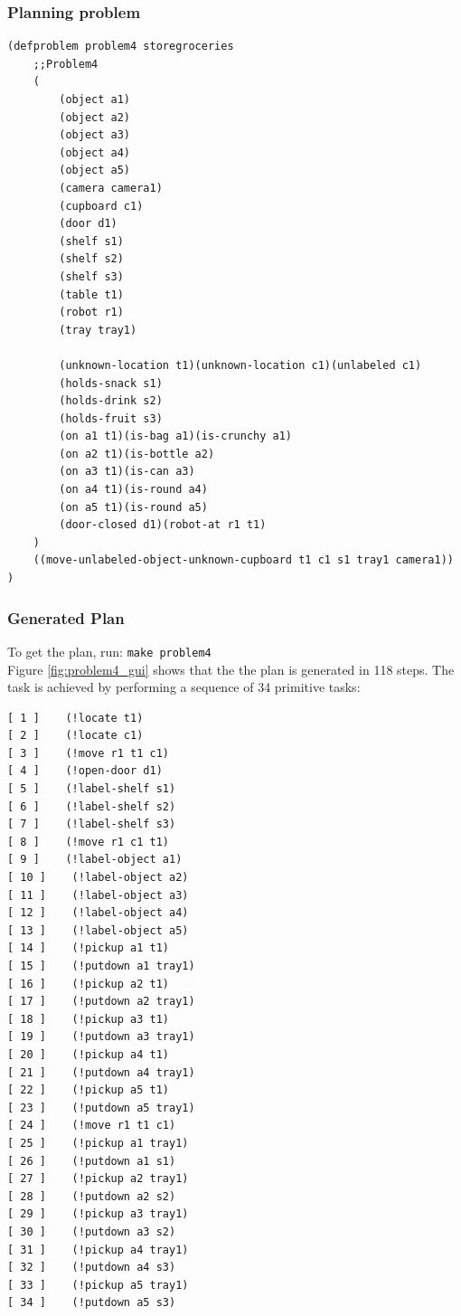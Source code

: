 \documentclass[paper=a4, fontsize=11pt]{scrartcl}
\begin{document}
	\subsubsection*{Planning problem}
	
	\begin{lstlisting}
(defproblem problem4 storegroceries
	;;Problem4
	(
		(object a1)
		(object a2)
		(object a3)
		(object a4)
		(object a5)
		(camera camera1)
		(cupboard c1)
		(door d1)
		(shelf s1)
		(shelf s2)
		(shelf s3)
		(table t1)
		(robot r1)
		(tray tray1)
		
		(unknown-location t1)(unknown-location c1)(unlabeled c1)
		(holds-snack s1)
		(holds-drink s2)
		(holds-fruit s3)
		(on a1 t1)(is-bag a1)(is-crunchy a1)
		(on a2 t1)(is-bottle a2)
		(on a3 t1)(is-can a3)
		(on a4 t1)(is-round a4)
		(on a5 t1)(is-round a5)
		(door-closed d1)(robot-at r1 t1)
	)
	((move-unlabeled-object-unknown-cupboard t1 c1 s1 tray1 camera1))
)
	\end{lstlisting}
	
	\subsubsection*{Generated Plan}
	
	To get the plan, run: \verb|make problem4| \\
	
	Figure \ref{fig:problem4_gui} shows that the the plan is generated in 118 steps. The task is achieved by performing a sequence of 34 primitive tasks: \\
	
	\begin{lstlisting}
[ 1 ]    (!locate t1)
[ 2 ]    (!locate c1)
[ 3 ]    (!move r1 t1 c1)
[ 4 ]    (!open-door d1)
[ 5 ]    (!label-shelf s1)
[ 6 ]    (!label-shelf s2)
[ 7 ]    (!label-shelf s3)
[ 8 ]    (!move r1 c1 t1)
[ 9 ]    (!label-object a1)
[ 10 ]    (!label-object a2)
[ 11 ]    (!label-object a3)
[ 12 ]    (!label-object a4)
[ 13 ]    (!label-object a5)
[ 14 ]    (!pickup a1 t1)
[ 15 ]    (!putdown a1 tray1)
[ 16 ]    (!pickup a2 t1)
[ 17 ]    (!putdown a2 tray1)
[ 18 ]    (!pickup a3 t1)
[ 19 ]    (!putdown a3 tray1)
[ 20 ]    (!pickup a4 t1)
[ 21 ]    (!putdown a4 tray1)
[ 22 ]    (!pickup a5 t1)
[ 23 ]    (!putdown a5 tray1)
[ 24 ]    (!move r1 t1 c1)
[ 25 ]    (!pickup a1 tray1)
[ 26 ]    (!putdown a1 s1)
[ 27 ]    (!pickup a2 tray1)
[ 28 ]    (!putdown a2 s2)
[ 29 ]    (!pickup a3 tray1)
[ 30 ]    (!putdown a3 s2)
[ 31 ]    (!pickup a4 tray1)
[ 32 ]    (!putdown a4 s3)
[ 33 ]    (!pickup a5 tray1)
[ 34 ]    (!putdown a5 s3)

	\end{lstlisting}
	
\end{document}
